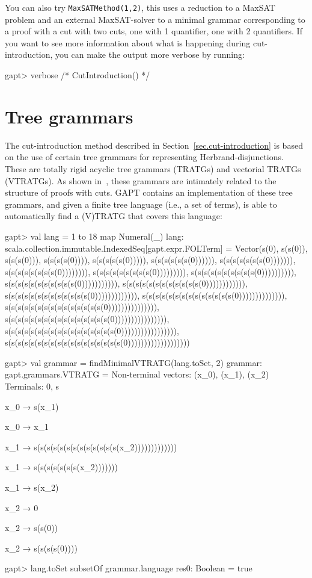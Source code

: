 \documentclass[a4paper,11pt]{book}
\begin{document}
You can also try \texttt{MaxSATMethod(1,2)}, this uses a reduction to a MaxSAT
problem and an external MaxSAT-solver to a
minimal grammar corresponding to a proof with a cut with two cuts, one with 1
quantifier, one with 2 quantifiers.  If you want to see more information
about what is happening during cut-introduction, you can make the output more
verbose by running:

\begin{clilisting}
gapt> verbose { /* CutIntroduction() */ }

\end{clilisting}

\section{Tree grammars}

The cut-introduction method described in Section~\ref{sec.cut-introduction} is
based on the use of certain tree grammars for representing Herbrand-disjunctions.
These are totally rigid acyclic tree grammars (TRATGs) and vectorial TRATGs (VTRATGs).
As shown in~\cite{Hetzl14Algorithmic}, these grammars are intimately related to
the structure of proofs with cuts.  GAPT contains an implementation of
these tree grammars, and given a finite tree language (i.e., a set of terms), is
able to automatically find a (V)TRATG that covers this language:

\begin{clilisting}
gapt> val lang = 1 to 18 map { Numeral(_) }
lang: scala.collection.immutable.IndexedSeq[gapt.expr.FOLTerm] = Vector(s(0), s(s(0)), s(s(s(0))), s(s(s(s(0)))), s(s(s(s(s(0))))), s(s(s(s(s(s(0)))))), s(s(s(s(s(s(s(0))))))), s(s(s(s(s(s(s(s(0)))))))), s(s(s(s(s(s(s(s(s(0))))))))), s(s(s(s(s(s(s(s(s(s(0)))))))))), s(s(s(s(s(s(s(s(s(s(s(0))))))))))), s(s(s(s(s(s(s(s(s(s(s(s(0)))))))))))), s(s(s(s(s(s(s(s(s(s(s(s(s(0))))))))))))), s(s(s(s(s(s(s(s(s(s(s(s(s(s(0)))))))))))))), s(s(s(s(s(s(s(s(s(s(s(s(s(s(s(0))))))))))))))), s(s(s(s(s(s(s(s(s(s(s(s(s(s(s(s(0)))))))))))))))), s(s(s(s(s(s(s(s(s(s(s(s(s(s(s(s(s(0))))))))))))))))), s(s(s(s(s(s(s(s(s(s(s(s(s(s(s(s(s(s(0)))))))))))))))))))

gapt> val grammar = findMinimalVTRATG(lang.toSet, 2)
grammar: gapt.grammars.VTRATG =
Non-terminal vectors: (x_0), (x_1), (x_2)
Terminals: 0, s

x_0 → s(x_1)

x_0 → x_1

x_1 → s(s(s(s(s(s(s(s(s(s(s(s(s(x_2)))))))))))))

x_1 → s(s(s(s(s(s(s(x_2)))))))

x_1 → s(x_2)

x_2 → 0

x_2 → s(s(0))

x_2 → s(s(s(s(0))))

gapt> lang.toSet subsetOf grammar.language
res0: Boolean = true

\end{clilisting}
\end{document}

